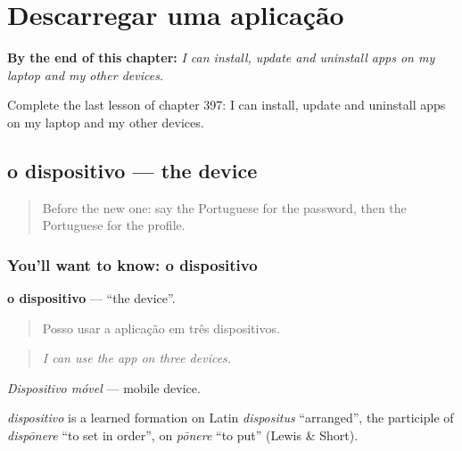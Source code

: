 
\chapter{Descarregar uma aplicação}
\label{ch:pt-descarregar-uma-aplicacao}

\begin{chapteropening}
\textbf{By the end of this chapter:} \emph{I can install, update and uninstall apps on my laptop and my other devices.}

Complete the last lesson of chapter 397: I can install, update and uninstall apps on my laptop and my other devices.
\end{chapteropening}

\section[o dispositivo]{o dispositivo — the device}

\label{lesson:PT-C397-dispositivo}



\begin{quote}
Before the new one: say the Portuguese for the password, then the Portuguese for the profile.
\end{quote}

\subsection*{You'll want to know: o dispositivo}
\textbf{o dispositivo} — \textquotedblleft{}the device\textquotedblright{}.

\begin{quote}
Posso usar a aplicação em três dispositivos.
\end{quote}

\begin{quote}
\emph{I can use the app on three devices.}
\end{quote}

\emph{Dispositivo móvel} — mobile device.

\begin{cousinweb}
\emph{dispositivo} is a learned formation on Latin \emph{dispositus} \textquotedblleft{}arranged\textquotedblright{}, the participle of \emph{dispōnere} \textquotedblleft{}to set in order\textquotedblright{}, on \emph{pōnere} \textquotedblleft{}to put\textquotedblright{} (Lewis \& Short).
\end{cousinweb}

